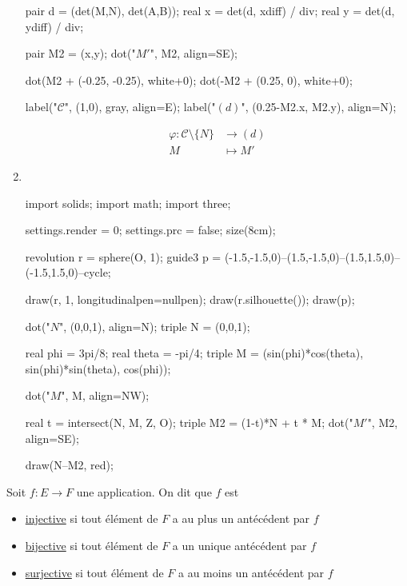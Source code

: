 \begin{exm}
\begin{enumerate}
\begin{center}
\begin{asy}
					pair d = (det(M,N), det(A,B));
					real x = det(d, xdiff) / div;
					real y = det(d, ydiff) / div;

					pair M2 = (x,y);
					dot("$M'$", M2, align=SE);

					dot(M2 + (-0.25, -0.25), white+0);
					dot(-M2 + (0.25, 0), white+0);

					label("$\mathcal{C}$", (1,0), gray, align=E);
					label("$(d)$", (0.25-M2.x, M2.y), align=N);
				\end{asy}
			\end{center}
			\begin{align*}
				\varphi: \mathcal{C}\setminus \{N\}  &\longrightarrow (d) \\
				M &\longmapsto M'
			\end{align*}
		\item~\\
			\begin{center}
				\begin{asy}
					import solids;
					import math;
					import three;

					settings.render = 0;
					settings.prc = false;
					size(8cm);

					revolution r = sphere(O, 1);
					guide3 p = (-1.5,-1.5,0)--(1.5,-1.5,0)--(1.5,1.5,0)--(-1.5,1.5,0)--cycle;

					draw(r, 1, longitudinalpen=nullpen);
					draw(r.silhouette());
					draw(p);

					dot("$N$", (0,0,1), align=N);
					triple N = (0,0,1);

					real phi = 3pi/8; real theta = -pi/4;
					triple M = (sin(phi)*cos(theta), sin(phi)*sin(theta), cos(phi));

					dot("$M$", M, align=NW);

					real t = intersect(N, M, Z, O);
					triple M2 = (1-t)*N + t * M;
					dot("$M'$", M2, align=SE);

					draw(N--M2, red);
				\end{asy}
			\end{center}
	\end{enumerate}
\end{exm}

\begin{defn}
	Soit $f: E \to F$ une application. On dit que $f$ est
	\begin{itemize}
		\item \underline{injective} si tout élément de $F$ a au plus un antécédent par $f$
		\item \underline{bijective} si tout élément de $F$ a un unique antécédent par $f$
		\item \underline{surjective} si tout élément de $F$ a au moins un antécédent par $f$
	\end{itemize}

\end{defn}


